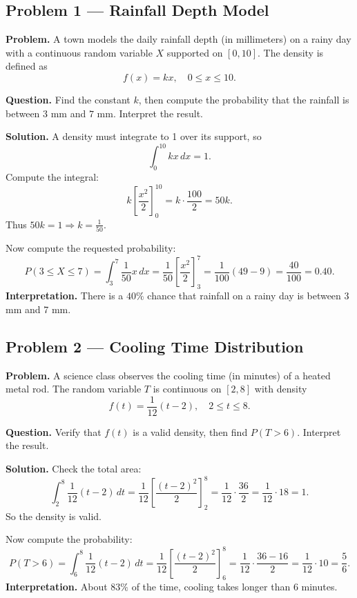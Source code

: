 	\begin{ExamProblems}
		
		\hypertarget{c1-ex1}{}
		\item
		\subsection*{Problem 1 — Rainfall Depth Model}
		
		\textbf{Problem.}
		A town models the daily rainfall depth (in millimeters) on a rainy day with a continuous random variable
		\(X\) supported on \([0, 10]\). The density is defined as
		\[
		f(x)=k x,\quad 0\le x\le 10.
		\]
		
		\textbf{Question.} Find the constant \(k\), then compute the probability that the rainfall is between
		\(3\) mm and \(7\) mm. Interpret the result.
		
		\textbf{Solution.}
		A density must integrate to 1 over its support, so
		\[
		\int_0^{10} kx\,dx = 1.
		\]
		Compute the integral:
		\[
		k\left[\frac{x^2}{2}\right]_0^{10}=k\cdot\frac{100}{2}=50k.
		\]
		Thus \(50k=1\Rightarrow k=\frac{1}{50}.\)
		
		Now compute the requested probability:
		\[
		P(3\le X\le 7)=\int_3^7 \frac{1}{50}x\,dx
		=\frac{1}{50}\left[\frac{x^2}{2}\right]_3^7
		=\frac{1}{100}(49-9)=\frac{40}{100}=0.40.
		\]
		\textbf{Interpretation.} There is a \(40\%\) chance that rainfall on a rainy day is between 3 mm and 7 mm.
		
		
		\hypertarget{c1-ex2}{}
		\item
		\subsection*{Problem 2 — Cooling Time Distribution}
		
		\textbf{Problem.}
		A science class observes the cooling time (in minutes) of a heated metal rod. The random variable
		\(T\) is continuous on \([2, 8]\) with density
		\[
		f(t)=\frac{1}{12}(t-2),\quad 2\le t\le 8.
		\]
		
		\textbf{Question.} Verify that \(f(t)\) is a valid density, then find \(P(T>6)\). Interpret the result.
		
		\textbf{Solution.}
		Check the total area:
		\[
		\int_2^8 \frac{1}{12}(t-2)\,dt
		=\frac{1}{12}\left[\frac{(t-2)^2}{2}\right]_2^8
		=\frac{1}{12}\cdot\frac{36}{2}=\frac{1}{12}\cdot 18=1.
		\]
		So the density is valid.
		
		Now compute the probability:
		\[
		P(T>6)=\int_6^8 \frac{1}{12}(t-2)\,dt
		=\frac{1}{12}\left[\frac{(t-2)^2}{2}\right]_6^8
		=\frac{1}{12}\cdot\frac{36-16}{2}
		=\frac{1}{12}\cdot 10=\frac{5}{6}.
		\]
		\textbf{Interpretation.} About \(83\%\) of the time, cooling takes longer than 6 minutes.
		
	\end{ExamProblems}
	
